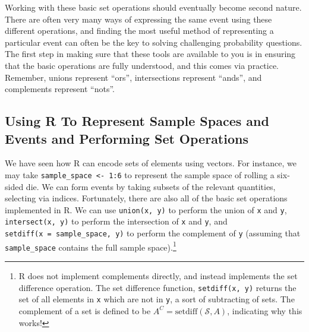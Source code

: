 \documentclass[
  letterpaper,
  DIV=11,
  numbers=noendperiod]{scrreprt}
\theoremstyle{definition}
\theoremstyle{definition}
\theoremstyle{definition}
\theoremstyle{remark}
\begin{document}
Working with these basic set operations should eventually become second
nature. There are often very many ways of expressing the same event
using these different operations, and finding the most useful method of
representing a particular event can often be the key to solving
challenging probability questions. The first step in making sure that
these tools are available to you is in ensuring that the basic
operations are fully understood, and this comes via practice. Remember,
unions represent ``ors'', intersections represent ``ands'', and
complements represent ``nots''.

\subsection{Using R To Represent Sample Spaces and Events and Performing
Set
Operations}\label{using-r-to-represent-sample-spaces-and-events-and-performing-set-operations}

We have seen how R can encode sets of elements using vectors. For
instance, we may take \texttt{sample\_space\ \textless{}-\ 1:6} to
represent the sample space of rolling a six-sided die. We can form
events by taking subsets of the relevant quantities, selecting via
indices. Fortunately, there are also all of the basic set operations
implemented in R. We can use \texttt{union(x,\ y)} to perform the union
of \texttt{x} and \texttt{y}, \texttt{intersect(x,\ y)} to perform the
intersection of \texttt{x} and \texttt{y}, and
\texttt{setdiff(x\ =\ sample\_space,\ y)} to perform the complement of
\texttt{y} (assuming that \texttt{sample\_space} contains the full
sample space).\footnote{R does not implement complements directly, and
  instead implements the set difference operation. The set difference
  function, \texttt{setdiff(x,\ y)} returns the set of all elements in
  \texttt{x} which are not in \texttt{y}, a sort of subtracting of sets.
  The complement of a set is defined to be
  \(A^C = \text{setdiff}(\mathcal{S}, A)\), indicating why this works!}
\end{document}
